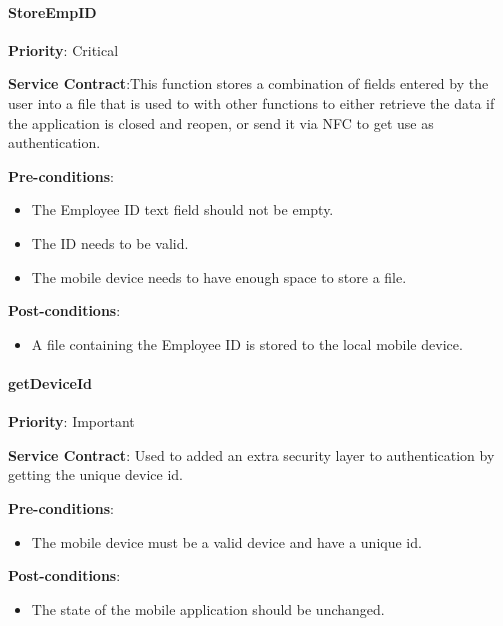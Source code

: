 		\paragraph{StoreEmpID}
			\begin{description}
			    \item{\textbf{Priority}:} Critical %
			    \item{\textbf{Service Contract}:}This function stores a combination of fields entered by the user into a file that is used to with other functions to either retrieve the data if the application is closed and reopen, or send it via NFC to get use as authentication.%
			    \item{\textbf{Pre-conditions}:}%
    			    \begin{itemize}
    			        \item The Employee ID text field should not be empty.
    			        \item The ID needs to be valid.
    			        \item The mobile device needs to have enough space to store a file.

    			    \end{itemize}
			    \item{\textbf{Post-conditions}:} %
    			    \begin{itemize}
    			    \item A file containing the Employee ID is stored to the local mobile device.
    			    \end{itemize}
			\end{description}	
				
		\paragraph{getDeviceId}
			\begin{description}
			    \item{\textbf{Priority}:} Important%
			    \item{\textbf{Service Contract}:} Used to added an extra security layer to authentication by getting the unique device id.%
			    \item{\textbf{Pre-conditions}:}%
    			    \begin{itemize}
    			        \item The mobile device must be a valid device and have a unique id.
    			    \end{itemize}
			    \item{\textbf{Post-conditions}:} %
    			    \begin{itemize}
    			    \item The state of the mobile application should be unchanged.
    			    \end{itemize}
			\end{description}	
			
